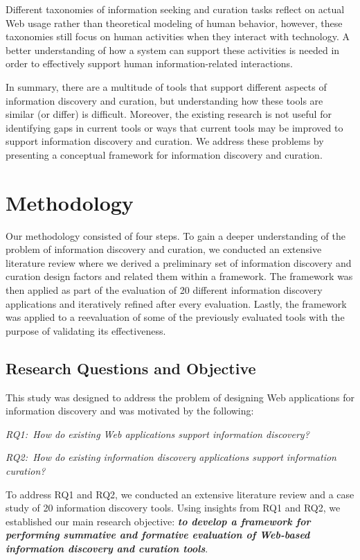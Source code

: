 \documentclass{sigchi}
\begin{document}
Different taxonomies of information seeking and curation tasks reflect on actual Web usage rather than theoretical modeling of human behavior, however, these taxonomies still focus on human activities when they interact with technology. A better understanding of how a system can support these activities is needed in order to effectively support human information-related interactions. 

In summary, there are a multitude of tools that support different aspects of information discovery and curation, but understanding how these tools are similar (or differ) is difficult. Moreover, the existing research is not useful for identifying gaps in current tools or ways that current tools may be improved to support information discovery and curation. We address these problems by presenting a conceptual framework for information discovery and curation.

\section{Methodology}
\label{section:methodology}
Our methodology consisted of four steps. To gain a deeper understanding of the problem of information discovery and curation, we conducted an extensive literature review where we derived a preliminary set of information discovery and curation design factors and related them within a framework. The framework was then applied as part of the evaluation of 20 different information discovery applications and iteratively refined after every evaluation. Lastly, the framework was applied to a reevaluation of some of the previously evaluated tools with the purpose of validating its effectiveness. 

{\subsection{Research Questions and Objective}
This study was designed to address the problem of designing Web applications for information discovery and was motivated by the following:

\emph{RQ1:~How do existing Web applications support information discovery?}

\emph{RQ2:~How do existing information discovery applications support information curation?}

To address RQ1 and RQ2, we conducted an extensive literature review and a case study of 20 information discovery tools. Using insights from RQ1 and RQ2, we established our main research objective: \emph{\textbf{to develop a framework for performing summative and formative evaluation of Web-based information discovery and curation tools}}.

}%
\end{document}
